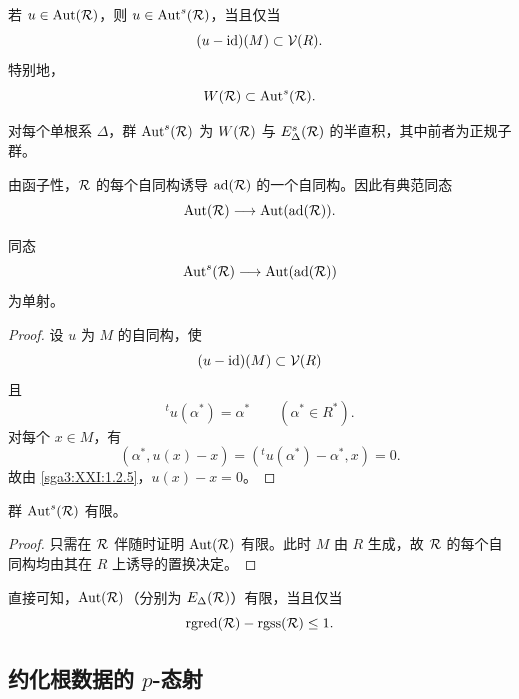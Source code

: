 \begin{remark}\label{sga3:XXI:6.7.4}
若 \(u\in\operatorname{Aut}(\mathcal{R})\)，则 \(u\in\operatorname{Aut}^{s}(\mathcal{R})\)，当且仅当
\[
 (u-\operatorname{id})(M)\subset\mathcal{V}(R).
\]
特别地，
\[
 W(\mathcal{R})\subset\operatorname{Aut}^{s}(\mathcal{R}).
\]
\end{remark}

\begin{proposition}\label{sga3:XXI:6.7.5}
对每个单根系 \(\Delta\)，群 \(\operatorname{Aut}^{s}(\mathcal{R})\) 为 \(W(\mathcal{R})\) 与 \(E_\Delta^{s}(\mathcal{R})\) 的半直积，其中前者为正规子群。
\end{proposition}

由函子性，\(\mathcal{R}\) 的每个自同构诱导 \(\operatorname{ad}(\mathcal{R})\) 的一个自同构。因此有典范同态
\[
 \operatorname{Aut}(\mathcal{R})\longrightarrow
 \operatorname{Aut}(\operatorname{ad}(\mathcal{R})).
\]

\begin{lemma}\label{sga3:XXI:6.7.6}
同态
\[
 \operatorname{Aut}^{s}(\mathcal{R})\longrightarrow
 \operatorname{Aut}(\operatorname{ad}(\mathcal{R}))
\]
为单射。
\end{lemma}

\begin{proof}
设 \(u\) 为 \(M\) 的自同构，使
\[
 (u-\operatorname{id})(M)\subset\mathcal{V}(R)
\]
且
\[
 {}^tu(\alpha^\ast)=\alpha^\ast
 \qquad(\alpha^\ast\in R^\ast).
\]
对每个 \(x\in M\)，有
\[
 (\alpha^\ast,u(x)-x)
 =({}^tu(\alpha^\ast)-\alpha^\ast,x)=0.
\]
故由 \ref{sga3:XXI:1.2.5}，\(u(x)-x=0\)。
\end{proof}

\begin{lemma}\label{sga3:XXI:6.7.7}
群 \(\operatorname{Aut}^{s}(\mathcal{R})\) 有限。
\end{lemma}

\begin{proof}
只需在 \(\mathcal{R}\) 伴随时证明 \(\operatorname{Aut}(\mathcal{R})\) 有限。此时 \(M\) 由 \(R\) 生成，故 \(\mathcal{R}\) 的每个自同构均由其在 \(R\) 上诱导的置换决定。
\end{proof}

\begin{remark}\label{sga3:XXI:6.7.8}
直接可知，\(\operatorname{Aut}(\mathcal{R})\)（分别为 \(E_\Delta(\mathcal{R})\)）有限，当且仅当
\[
 \operatorname{rgred}(\mathcal{R})-\operatorname{rgss}(\mathcal{R})\leq1.
\]
\end{remark}

\subsection{约化根数据的 \(p\)-态射}
\label{sga3:XXI:6.8}

